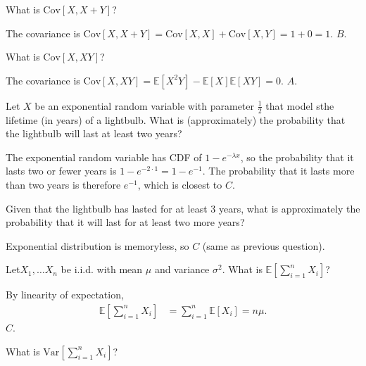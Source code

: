 \documentclass[a4paper]{article}
\begin{document}
\begin{Exercise}
	What is $\text{Cov}[X, X + Y]$?
\end{Exercise}
\begin{Solution}
	The covariance is $\text{Cov}[X, X + Y] = \text{Cov}[X, X] + \text{Cov}[X, Y] = 1 + 0 = 1.$ $\boxed{B}$.
\end{Solution}
\begin{Exercise}
	What is $\text{Cov}[X, XY]$?
\end{Exercise}
\begin{Solution}
	The covariance is $\text{Cov}[X, XY] = \mathbb{E}[X^2Y] - \mathbb{E}[X] \mathbb{E}[XY] = 0.$ $\boxed{A}$.
\end{Solution}
\begin{Exercise}
	Let $X$ be an exponential random variable with parameter $\frac{1}{2}$ that model sthe lifetime (in years) of a lightbulb. What is (approximately) the probability that the lightbulb will last at least two years?
\end{Exercise}
\begin{Solution}
	The exponential random variable has CDF of $1 - e^{-\lambda x}$, so the probability that it lasts two or fewer years is $1 - e^{-2 \cdot 1} = 1 - e^{-1}$. The probability that it lasts more than two years is therefore $e^{-1}$, which is closest to $\boxed{C}$.
\end{Solution}
\begin{Exercise}
	Given that the lightbulb has lasted for at least 3 years, what is approximately the probability that it will last for at least two more years?
\end{Exercise}
\begin{Solution}
	Exponential distribution is memoryless, so $\boxed{C}$ (same as previous question).
\end{Solution}
\begin{Exercise}
	Let$X_1, \ldots X_n$ be i.i.d. with mean $\mu$ and variance $\sigma^2$. What is $\mathbb{E}\left[\sum_{i = 1}^n X_i\right]$?
\end{Exercise}
\begin{Solution}
	By linearity of expectation,
	\begin{align*}
		\mathbb{E} \left[ \sum_{i = 1}^{n} X_i \right] &= \sum_{i = 1}^{n} \mathbb{E}[X_i] = n \mu.
	\end{align*}
	$\boxed{C}$.
\end{Solution}
\begin{Exercise}
	What is $\text{Var}[\sum_{i = 1}^{n} X_i]$?
\end{Exercise}
\end{document}

